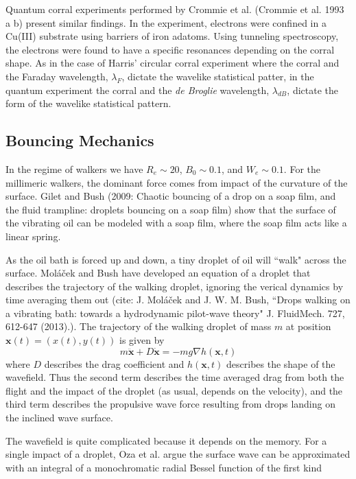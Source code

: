 Quantum corral experiments performed by Crommie et al. (Crommie et al. 1993 a b) present similar findings. In the experiment, electrons were confined in a Cu(III) substrate using barriers of iron adatoms. Using tunneling spectroscopy, the electrons were found to have a specific resonances depending on the corral shape. As in the case of Harris' circular corral experiment where the corral and the Faraday wavelength, $\lambda_F$, dictate the wavelike statistical patter, in the quantum experiment the corral and the \textit{de Broglie} wavelength, $\lambda_{dB}$, dictate the form of the wavelike statistical pattern. 

\subsection{Bouncing Mechanics}
In the regime of walkers we have $R_e \sim 20$, $B_0 \sim 0.1$, and $W_e \sim 0.1$. For the millimeric walkers, the dominant force comes from impact of the curvature of the surface. Gilet and Bush (2009: Chaotic bouncing of a drop on a soap film, and the fluid trampline: droplets bouncing on a soap film) show that the surface of the vibrating oil can be modeled with a soap film, where the soap film acts like a linear spring. 

As the oil bath is forced up and down, a tiny droplet of oil will ``walk" across the surface. Mol\'{a}\v{c}ek and Bush have developed an equation of a droplet that describes the trajectory of the walking droplet, ignoring the verical dynamics by time averaging them out (cite: J. Mol\'{a}\v{c}ek and J. W. M. Bush, ``Drops walking on a vibrating bath: towards a hydrodynamic pilot-wave theory" J. FluidMech. 727, 612-647 (2013).). The trajectory of the walking droplet of mass $m$ at position $\textbf{x}(t) = (x(t),y(t))$ is given by
\begin{equation}
m \ddot{\textbf{x}} + D \dot{\textbf{x}} = -mg\nabla h(\textbf{x},t) 
\end{equation}
where $D$ describes the drag coefficient and $h(\textbf{x},t)$ describes the shape of the wavefield. Thus the second term describes the time averaged drag from both the flight and the impact of the droplet (as usual, depends on the velocity), and the third term describes the propulsive wave force resulting from drops landing on the inclined wave surface. 

The wavefield is quite complicated because it depends on the memory. For a single impact of a droplet, Oza et al. argue the surface wave can be approximated with an integral of a monochromatic radial Bessel function of the first kind

